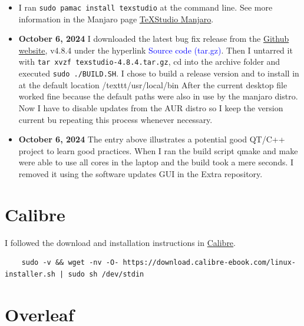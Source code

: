\documentclass[]{scrartcl}
\begin{document}
\begin{itemize}
	\item I ran \texttt{sudo pamac install texstudio} at the command line.
	See more information in the Manjaro page  \href{https://software.manjaro.org/package/texstudio}{\TeX{}Studio Manjaro}.
	
	\item \textbf{October 6, 2024} I downloaded  the latest bug fix release from the \href{https://github.com/texstudio-org/texstudio/releases}{Github website}, v4.8.4 under the hyperlink \textsf{\textcolor{blue}{Source code (tar.gz)}}.
	Then I untarred it with \texttt{tar xvzf texstudio-4.8.4.tar.gz}, cd into the  archive folder and executed \texttt{sudo ./BUILD.SH}. I chose to build a release version and to install in at the default location /texttt{/usr/local/bin}
	After the current desktop file worked fine because the default paths were also in use by the manjaro distro.
	Now I have to disable updates from the AUR distro so I keep the version current bu repeating this process whenever necessary.
	\item \textbf{October 6, 2024} The entry above illustrates a potential good QT/C++ project to learn good practices. When I ran the build script qmake and make were able to use all cores in the laptop and the build took a mere seconds.
	I removed it using the software updates GUI in the Extra repository.
\end{itemize}





\section{Calibre}

I followed the download and installation instructions in \href{https://calibre-ebook.com/download_linux}{Calibre}.

\begin{footnotesize}
\begin{verbatim}
	sudo -v && wget -nv -O- https://download.calibre-ebook.com/linux-installer.sh | sudo sh /dev/stdin
\end{verbatim}
\end{footnotesize}


\section[Overleaf]{Overleaf}
\label{sec:overleaf}
\end{document}
